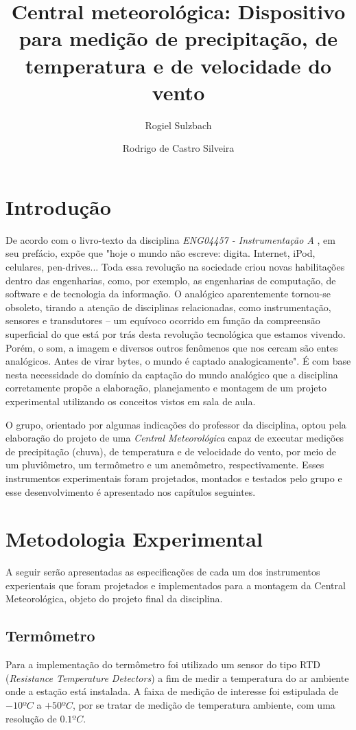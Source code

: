 \documentclass[a4paper]{instrumentacao}
\title{Central meteorológica: Dispositivo para medição de precipitação, de temperatura e de velocidade do vento}
\author{Rogiel Sulzbach \and Rodrigo de Castro Silveira}
\institute{Universidade Federal do Rio Grande do Sul, Departamento de Engenharia Elétrica, Curso de Engenharia Elétrica, Instrumentação A, Prof. Dr. Alexandre Balbinot}
\begin{document}
\fontsize{12pt}{16pt}\selectfont
\maketitle

\chapter{Introdução}
De acordo com o livro-texto da disciplina \textit{ENG04457 - Instrumentação A} \cite{livro-texto}, em seu prefácio, expõe que "hoje o mundo não escreve: digita. Internet, iPod, celulares, pen-drives... Toda essa revolução na sociedade criou novas habilitações dentro das engenharias, como, por exemplo, as engenharias de computação, de software e de tecnologia da informação. O analógico aparentemente tornou-se obsoleto, tirando a atenção de disciplinas relacionadas, como instrumentação, sensores e transdutores -- um equívoco ocorrido em função da compreensão superficial do que está por trás desta revolução tecnológica que estamos vivendo. Porém, o som, a imagem e diversos outros fenômenos que nos cercam são entes analógicos. Antes de virar bytes, o mundo é captado analogicamente". É com base nesta necessidade do domínio da captação do mundo analógico que a disciplina corretamente propõe a elaboração, planejamento e montagem de um projeto experimental utilizando os conceitos vistos em sala de aula.

O grupo, orientado por algumas indicações do professor da disciplina, optou pela elaboração do projeto de uma \textit{Central Meteorológica} capaz de executar medições de precipitação (chuva), de temperatura e de velocidade do vento, por meio de um pluviômetro, um termômetro e um anemômetro, respectivamente. Esses instrumentos experimentais foram projetados, montados e testados pelo grupo e esse desenvolvimento é apresentado nos capítulos seguintes.

\chapter{Metodologia Experimental}
A seguir serão apresentadas as especificações de cada um dos instrumentos experientais que foram projetados e implementados para a montagem da Central Meteorológica, objeto do projeto final da disciplina.

\section{Termômetro}
Para a implementação do termômetro foi utilizado um sensor do tipo RTD (\textit{Resistance Temperature Detectors}) a fim de medir a temperatura do ar ambiente onde a estação está instalada. A faixa de medição de interesse foi estipulada de $-10ºC$ a $+50ºC$, por se tratar de medição de temperatura ambiente, com uma resolução de $0.1ºC$.
\end{document}

